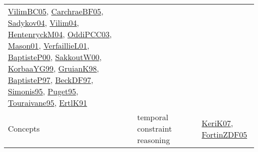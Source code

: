 {\begin{longtable}{lp{3cm}>{\raggedright}p{6cm}>{\raggedright}p{6cm}p{8cm}}
\href{articles/VilimBC05.pdf}{VilimBC05}\cite{VilimBC05}, \href{papers/CarchraeBF05.pdf}{CarchraeBF05}\cite{CarchraeBF05}, \href{papers/Sadykov04.pdf}{Sadykov04}\cite{Sadykov04}, \href{papers/Vilim04.pdf}{Vilim04}\cite{Vilim04}, \href{papers/HentenryckM04.pdf}{HentenryckM04}\cite{HentenryckM04}, \href{papers/OddiPCC03.pdf}{OddiPCC03}\cite{OddiPCC03}, \href{articles/Mason01.pdf}{Mason01}\cite{Mason01}, \href{papers/VerfaillieL01.pdf}{VerfaillieL01}\cite{VerfaillieL01}, \href{articles/BaptisteP00.pdf}{BaptisteP00}\cite{BaptisteP00}, \href{articles/SakkoutW00.pdf}{SakkoutW00}\cite{SakkoutW00}, \href{papers/KorbaaYG99.pdf}{KorbaaYG99}\cite{KorbaaYG99}, \href{papers/GruianK98.pdf}{GruianK98}\cite{GruianK98}, \href{papers/BaptisteP97.pdf}{BaptisteP97}\cite{BaptisteP97}, \href{papers/BeckDF97.pdf}{BeckDF97}\cite{BeckDF97}, \href{papers/Simonis95.pdf}{Simonis95}\cite{Simonis95}, \href{papers/Puget95.pdf}{Puget95}\cite{Puget95}, \href{papers/Touraivane95.pdf}{Touraivane95}\cite{Touraivane95}, \href{papers/ErtlK91.pdf}{ErtlK91}\cite{ErtlK91}\\
Concepts & temporal constraint reasoning &  &  & \href{papers/KeriK07.pdf}{KeriK07}\cite{KeriK07}, \href{papers/FortinZDF05.pdf}{FortinZDF05}\cite{FortinZDF05}\\

\end{longtable}}
